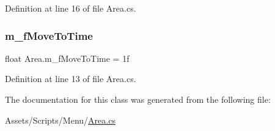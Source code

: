 Definition at line 16 of file Area.\+cs.

\mbox{\label{class_area_a5083090842eb5956fa82fefad261df59}} 
\subsubsection{\texorpdfstring{m\+\_\+f\+Move\+To\+Time}{m\_fMoveToTime}}
{\footnotesize\ttfamily float Area.\+m\+\_\+f\+Move\+To\+Time = 1f}



Definition at line 13 of file Area.\+cs.



The documentation for this class was generated from the following file\+:\begin{DoxyCompactItemize}
\item 
Assets/\+Scripts/\+Menu/\mbox{\hyperlink{_area_8cs}{Area.\+cs}}\end{DoxyCompactItemize}
